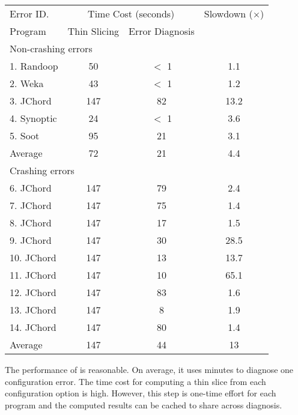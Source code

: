 \begin{table}[t]
\setlength{\tabcolsep}{.44\tabcolsep}
\begin{tabular}{|l|c|c|c|}
\hline
 Error ID. & \multicolumn{2}{|c|}{Time Cost (seconds)} & Slowdown ($\times$)\\
\cline{2-3}
 Program & Thin Slicing & Error Diagnosis &  \\
 \hline
\hline
\multicolumn{4}{|l|}{Non-crashing errors}   \\
 \hline
 1. Randoop & 50 & $<$ 1 & 1.1\\
 2. Weka & 43 & $<$ 1 & 1.2 \\
 3. JChord & 147 & 82 & 13.2\\
 4. Synoptic & 24 & $<$ 1 & 3.6 \\
 5. Soot & 95 & 21 & 3.1 \\
\hline
Average & 72 & 21 & 4.4\\
\hline
\hline
\multicolumn{4}{|l|}{Crashing errors}   \\
\hline
 6. JChord & 147 & 79 & 2.4\\
 7. JChord & 147 & 75 & 1.4\\
 8. JChord & 147 & 17 &1.5\\
 9. JChord & 147 & 30 & 28.5\\
 10. JChord & 147 & 13 &13.7\\
 11. JChord & 147 & 10 &65.1 \\
 12. JChord & 147 & 83 &1.6\\
 13. JChord & 147 & 8 &1.9\\
 14. JChord & 147 & 80 &1.4\\
\hline
Average & 147 & 44 & 13\\
\hline
\end{tabular}

\end{table}

The performance of \ourtool is reasonable.
On average, it uses \avgtime minutes to
diagnose one configuration error. The time cost for
computing a thin slice from each configuration option
is high. However, this step is one-time effort
for each program and the computed results can be cached
to share across diagnosis. %

